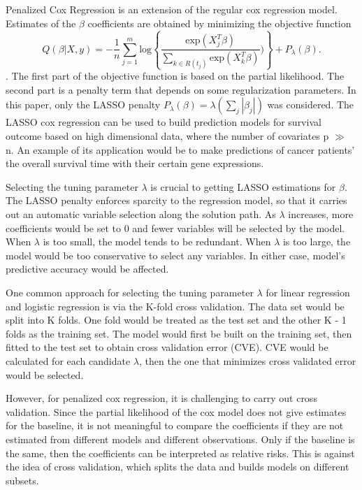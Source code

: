 Penalized Cox Regression is an extension of the regular cox regression model. Estimates of the $\beta$ coefficients are obtained by minimizing the objective function \begin{equation}  Q(\beta |X, y) = - \frac{1}{n}  \sum_{j=1}^{m} \text{log} \left \{\frac{\text{exp} ( X_{j}^{T} \beta)}{\sum_{ k \in R(t_{j})}\text{exp} ( X_{k}^{T} \beta)}) \right \} + P_{\lambda}(\beta). \end{equation} \citep{Simon2011}. The first part of the objective function is based on the partial likelihood. The second part is a penalty term that depends on some regularization parameters. In this paper, only the LASSO penalty $P_{\lambda}(\beta) = \lambda (\sum_{j} |\beta_{j}|)$ was considered. The LASSO cox regression can be used to build prediction models for survival outcome based on high dimensional data, where the number of covariates p $\gg$ n. An example of its application would be to make predictions of cancer patients' the overall survival time with their certain gene expressions.

Selecting the tuning parameter $\lambda$ is crucial to getting LASSO estimations for $\beta$. The LASSO penalty enforces sparcity to the regression model, so that it carries out an automatic variable selection along the solution path. As $\lambda$ increases, more coefficients would be set to 0 and fewer variables will be selected by the model. When $\lambda$ is too small, the model tends to be redundant. When $\lambda$ is too large, the model would be too conservative to select any variables. In either case, model's predictive accuracy would be affected.

One common approach for selecting the tuning parameter $\lambda$ for linear regression and logistic regression is via the K-fold cross validation. The data set would be split into K folds. One fold would be treated as the test set and the other K - 1 folds as the training set. The model would first be built on the training set, then fitted to the test set to obtain cross validation error (CVE).  CVE would be calculated for each candidate $\lambda$, then the one that minimizes cross validated error would be selected.

However, for penalized cox regression, it is challenging to carry out cross validation. Since the partial likelihood of the cox model does not give estimates for the baseline, it is not meaningful to compare the coefficients if they are not estimated from different models and different observations. Only if the baseline is the same, then the coefficients can be interpreted as relative risks. This is against the idea of cross validation, which splits the data and builds models on different subsets.

